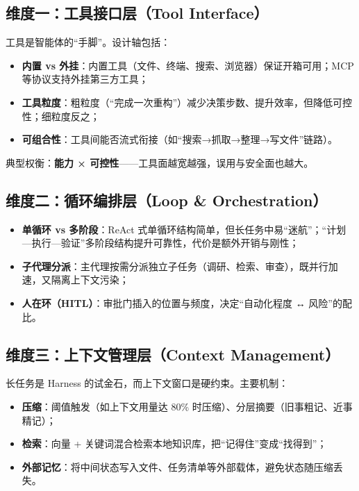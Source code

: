 \documentclass[11pt,a4paper]{ctexart}
\begin{document}
\subsection{维度一：工具接口层（Tool Interface）}

工具是智能体的“手脚”。设计轴包括：

\begin{itemize}
  \item \textbf{内置 vs 外挂}：内置工具（文件、终端、搜索、浏览器）保证开箱可用；MCP 等协议支持外挂第三方工具；
  \item \textbf{工具粒度}：粗粒度（“完成一次重构”）减少决策步数、提升效率，但降低可控性；细粒度反之；
  \item \textbf{可组合性}：工具间能否流式衔接（如“搜索→抓取→整理→写文件”链路）。
\end{itemize}

典型权衡：\textbf{能力 × 可控性}——工具面越宽越强，误用与安全面也越大。

\subsection{维度二：循环编排层（Loop \& Orchestration）}

\begin{itemize}
  \item \textbf{单循环 vs 多阶段}：ReAct 式单循环结构简单，但长任务中易“迷航”；“计划—执行—验证”多阶段结构提升可靠性，代价是额外开销与刚性；
  \item \textbf{子代理分派}：主代理按需分派独立子任务（调研、检索、审查），既并行加速，又隔离上下文污染；
  \item \textbf{人在环（HITL）}：审批门插入的位置与频度，决定“自动化程度 ↔ 风险”的配比。
\end{itemize}

\subsection{维度三：上下文管理层（Context Management）}

长任务是 Harness 的试金石，而上下文窗口是硬约束。主要机制：

\begin{itemize}
  \item \textbf{压缩}：阈值触发（如上下文用量达 80\% 时压缩）、分层摘要（旧事粗记、近事精记）；
  \item \textbf{检索}：向量 + 关键词混合检索本地知识库，把“记得住”变成“找得到”；
  \item \textbf{外部记忆}：将中间状态写入文件、任务清单等外部载体，避免状态随压缩丢失。
\end{itemize}
\end{document}
